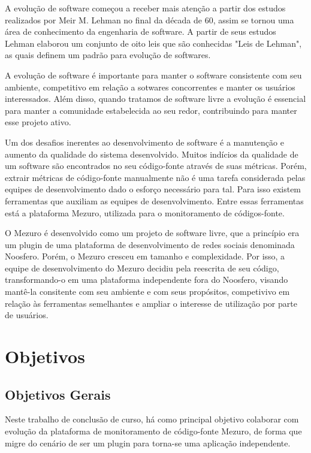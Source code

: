 A evolução de software começou a receber mais atenção a partir dos estudos realizados por Meir M. Lehman no final da década de 60, assim se tornou uma área de conhecimento da engenharia de software. A partir de seus estudos Lehman elaborou um conjunto de oito leis que são conhecidas "Leis de Lehman", as quais definem um padrão para evolução de softwares.

A evolução de software é importante para manter o software consistente com seu ambiente, competitivo em relação a sotwares concorrentes e manter os usuários interessados. Além disso, quando tratamos de software livre a evolução é essencial para manter a comunidade estabelecida ao seu redor, contribuindo para manter esse projeto ativo.

Um dos desafios inerentes ao desenvolvimento de software é a manutenção e aumento da qualidade do sistema desenvolvido. Muitos indícios da qualidade de um software são encontrados no seu código-fonte através de suas métricas.
Porém, extrair métricas de código-fonte manualmente não é uma tarefa considerada pelas equipes de desenvolvimento dado o esforço necessário para tal. Para isso existem ferramentas que auxiliam as equipes de desenvolvimento. Entre essas ferramentas está a plataforma Mezuro, utilizada para o monitoramento de códigos-fonte.

O Mezuro é desenvolvido como um projeto de software livre, que a princípio era um plugin de uma plataforma de desenvolvimento de redes sociais denominada Noosfero.
Porém, o Mezuro cresceu em tamanho e complexidade. Por isso, a equipe de desenvolvimento do Mezuro decidiu pela reescrita de seu código, transformando-o em uma plataforma independente fora do Noosfero, visando mantê-la consitente com seu ambiente e com seus propósitos, competivivo em relação às ferramentas semelhantes e ampliar o interesse de utilização por parte de usuários.

\section{Objetivos}

\subsection{Objetivos Gerais}

Neste trabalho de conclusão de curso, há como principal objetivo colaborar com evolução da plataforma de monitoramento de código-fonte Mezuro, de forma que migre do cenário de ser um plugin para torna-se uma aplicação independente.

